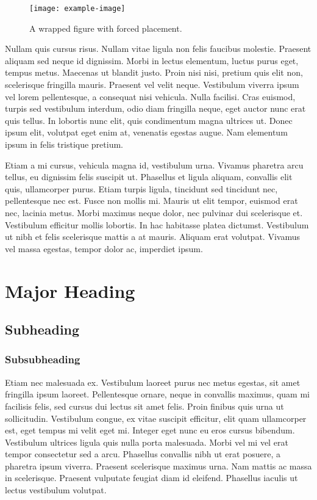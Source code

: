 \documentclass[12pt]{report}
\begin{document}
\begin{wrapfigure}{r}{0.4\textwidth}
    \centering
    \texttt{[image: example-image]}
    \caption{A wrapped figure with forced placement.}
\end{wrapfigure}

Nullam quis cursus risus. Nullam vitae ligula non felis faucibus molestie. Praesent aliquam sed neque id dignissim. Morbi in lectus elementum, luctus purus eget, tempus metus. Maecenas ut blandit justo. Proin nisi nisi, pretium quis elit non, scelerisque fringilla mauris. Praesent vel velit neque. Vestibulum viverra ipsum vel lorem pellentesque, a consequat nisi vehicula. Nulla facilisi. Cras euismod, turpis sed vestibulum interdum, odio diam fringilla neque, eget auctor nunc erat quis tellus. In lobortis nunc elit, quis condimentum magna ultrices ut. Donec ipsum elit, volutpat eget enim at, venenatis egestas augue. Nam elementum ipsum in felis tristique pretium.

Etiam a mi cursus, vehicula magna id, vestibulum urna. Vivamus pharetra arcu tellus, eu dignissim felis suscipit ut. Phasellus et ligula aliquam, convallis elit quis, ullamcorper purus. Etiam turpis ligula, tincidunt sed tincidunt nec, pellentesque nec est. Fusce non mollis mi. Mauris ut elit tempor, euismod erat nec, lacinia metus. Morbi maximus neque dolor, nec pulvinar dui scelerisque et. Vestibulum efficitur mollis lobortis. In hac habitasse platea dictumst. Vestibulum ut nibh et felis scelerisque mattis a at mauris. Aliquam erat volutpat. Vivamus vel massa egestas, tempor dolor ac, imperdiet ipsum.

\section{Major Heading}
\subsection{Subheading}
\subsubsection{Subsubheading}
Etiam nec malesuada ex. Vestibulum laoreet purus nec metus egestas, sit amet fringilla ipsum laoreet. Pellentesque ornare, neque in convallis maximus, quam mi facilisis felis, sed cursus dui lectus sit amet felis. Proin finibus quis urna ut sollicitudin. Vestibulum congue, ex vitae suscipit efficitur, elit quam ullamcorper est, eget tempus mi velit eget mi. Integer eget nunc eu eros cursus bibendum. Vestibulum ultrices ligula quis nulla porta malesuada. Morbi vel mi vel erat tempor consectetur sed a arcu. Phasellus convallis nibh ut erat posuere, a pharetra ipsum viverra. Praesent scelerisque maximus urna. Nam mattis ac massa in scelerisque. Praesent vulputate feugiat diam id eleifend. Phasellus iaculis ut lectus vestibulum volutpat.
\end{document}
